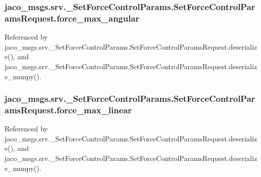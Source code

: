 \subsubsection[{\texorpdfstring{force\+\_\+max\+\_\+angular}{force_max_angular}}]{\setlength{\rightskip}{0pt plus 5cm}jaco\+\_\+msgs.\+srv.\+\_\+\+Set\+Force\+Control\+Params.\+Set\+Force\+Control\+Params\+Request.\+force\+\_\+max\+\_\+angular}\hypertarget{classjaco__msgs_1_1srv_1_1__SetForceControlParams_1_1SetForceControlParamsRequest_a1e80687d03a465ee0a3b22923e11d7d1}{}\label{classjaco__msgs_1_1srv_1_1__SetForceControlParams_1_1SetForceControlParamsRequest_a1e80687d03a465ee0a3b22923e11d7d1}


Referenced by jaco\+\_\+msgs.\+srv.\+\_\+\+Set\+Force\+Control\+Params.\+Set\+Force\+Control\+Params\+Request.\+deserialize(), and jaco\+\_\+msgs.\+srv.\+\_\+\+Set\+Force\+Control\+Params.\+Set\+Force\+Control\+Params\+Request.\+deserialize\+\_\+numpy().

\subsubsection[{\texorpdfstring{force\+\_\+max\+\_\+linear}{force_max_linear}}]{\setlength{\rightskip}{0pt plus 5cm}jaco\+\_\+msgs.\+srv.\+\_\+\+Set\+Force\+Control\+Params.\+Set\+Force\+Control\+Params\+Request.\+force\+\_\+max\+\_\+linear}\hypertarget{classjaco__msgs_1_1srv_1_1__SetForceControlParams_1_1SetForceControlParamsRequest_aae9888fc8efdf00c292dfaf866c90f7f}{}\label{classjaco__msgs_1_1srv_1_1__SetForceControlParams_1_1SetForceControlParamsRequest_aae9888fc8efdf00c292dfaf866c90f7f}


Referenced by jaco\+\_\+msgs.\+srv.\+\_\+\+Set\+Force\+Control\+Params.\+Set\+Force\+Control\+Params\+Request.\+deserialize(), and jaco\+\_\+msgs.\+srv.\+\_\+\+Set\+Force\+Control\+Params.\+Set\+Force\+Control\+Params\+Request.\+deserialize\+\_\+numpy().

